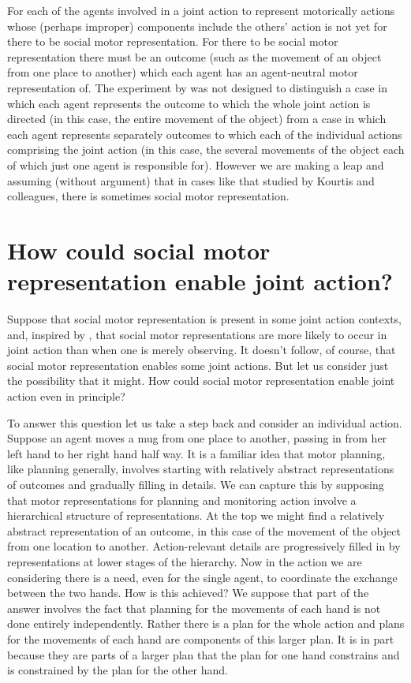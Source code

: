 \documentclass[12pt,\papersize]{extarticle}
\begin{document}
For each of the agents involved in a joint action to represent motorically actions whose (perhaps improper) components include the others' action is not yet for there to be social motor representation.
For there to be social motor representation there must be an outcome (such as the movement of an object from one place to another) which each agent has an agent-neutral motor representation of.
The experiment by \citet{kourtis:2010_favoritism} was not designed to distinguish
a case in which each agent represents the outcome to which the  whole joint action is directed (in this case, the entire movement of the object)
from
a case in which 
each agent represents separately outcomes to which each of the individual actions comprising the joint action (in this case, the several movements of the object each of which just one agent is responsible for).
However we are making a leap and assuming (without argument) that in cases like that studied by Kourtis and colleagues, there is sometimes social motor representation.



\section{How could social motor representation enable joint action?}
Suppose that social motor representation is present in some joint action contexts, and, inspired by \citet{kourtis:2010_favoritism}, that 
social motor representations are more likely to occur in joint action than when one is merely observing.
It doesn't follow, of course, that social motor representation enables some joint actions.
But let us consider just the possibility that it might.
How could social motor representation enable joint action even in principle?

To answer this question
let us take a step back and consider an individual action.
Suppose an agent moves a mug from one place to another, passing in from her left hand to her right hand half way.
It is a familiar idea that motor planning, like planning generally, involves starting with relatively abstract representations of outcomes and gradually filling in details.
We can capture this by supposing that 
motor representations for planning and monitoring action involve a hierarchical structure of representations.
At the top we might find a relatively abstract representation of an outcome, in this case of the movement of the object from one location to another.
Action-relevant details are progressively filled in by representations at lower stages of the hierarchy. 
Now in the action we are considering there is a need, even for the single agent, to coordinate the exchange between the two hands.
How is this achieved? 
We suppose that part of the answer involves the fact that planning for the movements of each hand is not done entirely independently.
Rather there is a plan for the whole action
and plans for the movements of each hand are components of this larger plan.
It is in part because they are parts of a larger plan that the plan for one hand constrains and is constrained by the plan for the other hand.
\end{document}
